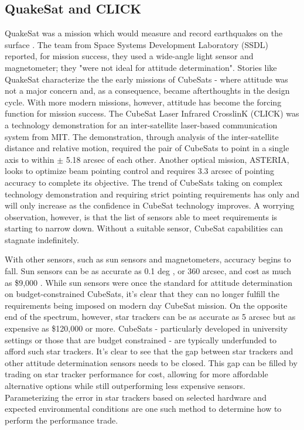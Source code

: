 \subsection*{QuakeSat and CLICK}
\par \qquad QuakeSat was a mission which would measure and record earthquakes on the surface \cite{QuakeSat}.
The team from Space Systems Development Laboratory (SSDL) reported, for mission success, they used a wide-angle light sensor and magnetometer; they "were not ideal for attitude determination"\cite{QuakeSat}.
Stories like QuakeSat characterize the the early missions of CubeSats - where attitude was not a major concern and, as a consequence, became afterthoughts in the design cycle.
With more modern missions, however, attitude has become the forcing function for mission success.
The CubeSat Laser Infrared CrosslinK (CLICK) was a technology demonstration for an inter-satellite laser-based communication system from MIT\cite{CubeSatCLICK}.
The demonstration, through analysis of the inter-satellite distance and relative motion, required the pair of CubeSats to point in a single axis to within $\pm$ 5.18 arcsec of each other.
Another optical mission, ASTERIA, looks to optimize beam pointing control and requires 3.3 arcsec \cite{OnOrbitBeamCalibration} of pointing accuracy to complete its objective.
The trend of CubeSats taking on complex technology demonstration and requiring strict pointing requirements has only and will only increase as the confidence in CubeSat technology improves.
A worrying observation, however, is that the list of sensors able to meet requirements is starting to narrow down. 
Without a suitable sensor, CubeSat capabilities can stagnate indefinitely.

\par \qquad With other sensors, such as sun sensors and magnetometers, accuracy begins to fall.
Sun sensors can be as accurate as 0.1 deg \cite{SunSensorA}, or 360 arcsec, and cost as much as \$9,000 \cite{CubeSatShop_SunSensor}. 
While sun sensors were once the standard for attitude determination on budget-constrained CubeSats, it's clear that they can no longer fulfill the requirements being imposed on modern day CubeSat mission.
On the opposite end of the spectrum, however, star trackers can be as accurate as 5 arcsec but as expensive as \$120,000 \cite{RocketLabStarTracker} or more.
CubeSats - particularly developed in university settings or those that are budget constrained - are typically underfunded to afford such star trackers. 
It's clear to see that the gap between star trackers and other attitude determination sensors needs to be closed. 
This gap can be filled by trading on star tracker performance for cost, allowing for more affordable alternative options while still outperforming less expensive sensors.
Parameterizing the error in star trackers based on selected hardware and expected environmental conditions are one such method to determine how to perform the performance trade.

